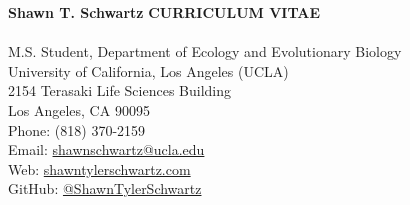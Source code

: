 {\LARGE \bf Shawn T. Schwartz} \hfill {\LARGE \bf C{\small URRICULUM} V{\small ITAE}} \\ \\
M.S. Student, Department of Ecology and Evolutionary Biology \\
University of California, Los Angeles (UCLA) \\
2154 Terasaki Life Sciences Building \\
Los Angeles, CA 90095 \\
Phone: (818) 370-2159 \\
Email:  \textcolor{RoyalBlue}{\href{mailto:shawnschwartz@ucla.edu}{shawnschwartz@ucla.edu}} \\
Web: \textcolor{RoyalBlue}{\href{https://shawntylerschwartz.com}{shawntylerschwartz.com}} \\
GitHub: \textcolor{RoyalBlue}{\href{https://github.com/ShawnTylerSchwartz}{@ShawnTylerSchwartz}} \\ \\
\vspace{-1.5cm}